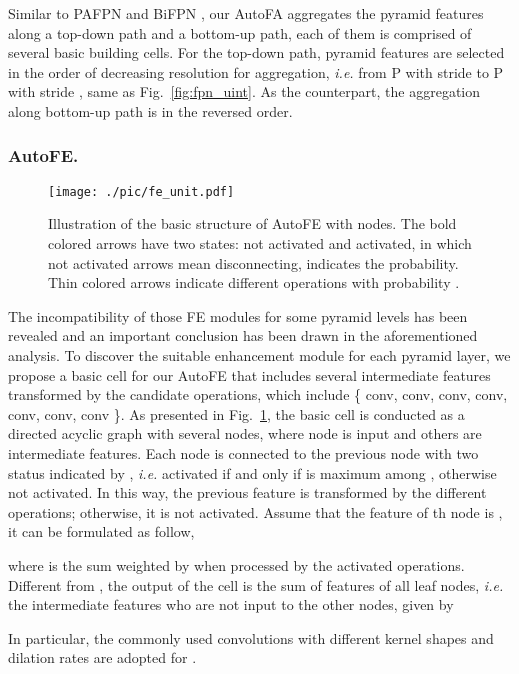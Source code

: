 \documentclass[sigconf]{acmart}
\begin{document}
Similar to PAFPN \cite{liu2018pafpn} and BiFPN \cite{tan2020efficientdet}, our AutoFA aggregates the pyramid features along a top-down path and a bottom-up path, each of them is comprised of several basic building cells. For the top-down path, pyramid features are selected in the order of decreasing resolution for aggregation, \textit{i.e.} from P with stride  to P with stride , same as Fig.~\ref{fig:fpn_uint}. As the counterpart, the aggregation along bottom-up path is in the reversed order.

\subsubsection{AutoFE.}
\begin{figure}[!t]
    \centering
    \texttt{[image: ./pic/fe\_unit.pdf]}
    \caption{Illustration of the basic structure of AutoFE with  nodes. The bold colored arrows have two states: not activated and activated, in which not activated arrows mean disconnecting,  indicates the probability. Thin colored arrows indicate different operations with probability .}
    \label{fig:fe_uint}
\end{figure}

The incompatibility of those FE modules for some pyramid levels has been revealed and an important conclusion has been drawn in the aforementioned analysis.
To discover the suitable enhancement module for each pyramid layer, we propose a basic cell for our AutoFE that includes several intermediate features transformed by the candidate operations, which include \{ conv,  conv,  conv,  conv,  conv,  conv,  conv \}. As presented in Fig.~\ref{fig:fe_uint}, the basic cell is conducted as a directed acyclic graph with several nodes, where node  is input and others are intermediate features. 
Each node  is connected to the previous node  with two status indicated by , \textit{i.e.} activated if and only if  is maximum among , otherwise not activated.
In this way, the previous feature is transformed by the different operations; otherwise, it is not activated. Assume that the feature of th node is , it can be formulated as follow,

where  is the sum weighted by  when processed by the activated operations. Different from \cite{liu2018darts,xu2019pcdarts}, the output of the cell is the sum of features of all leaf nodes, \textit{i.e.} the intermediate features who are not input to the other nodes, given by

In particular, the commonly used convolutions with different kernel shapes and dilation rates are adopted for .
\end{document}
